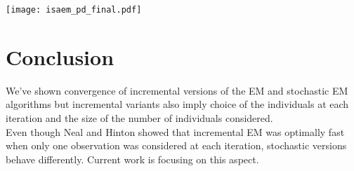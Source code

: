 \documentclass[a0,portrait]{a0poster}
\begin{document}
\begin{multicols}{2}
\begin{center}%
\texttt{[image: isaem\_pd\_final.pdf]}
\label{fig-dyn}
\end{center}\vspace{1cm}



\section{Conclusion}
\color{Navy} %
We've shown convergence of incremental versions of the EM and stochastic EM algorithms but incremental variants also imply choice of the individuals at each iteration and the size of the number of individuals considered.\\
Even though Neal and Hinton showed that incremental EM was optimally fast when only one observation was considered at each iteration, stochastic versions behave differently. Current work is focusing on this aspect.


\color{DarkSlateGray} %







\end{multicols}
\end{document}
